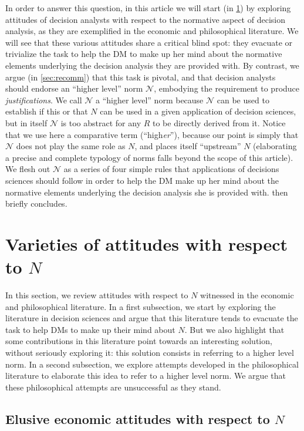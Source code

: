 \documentclass[preprint, french, english, 11pt, authoryear]{elsarticle}%
\newcommand{\protectforpdf}[1]{\texorpdfstring{\ensuremath{#1}}{#1}}
\newcommand{\adv}{\mathscr{N}}
\begin{document}
In order to answer this question, in this article we will start (in \cref{sec:existing}) by exploring attitudes of decision analysts with respect to the normative aspect of decision analysis, as they are exemplified in the economic and philosophical literature. We will see that these various attitudes share a critical blind spot: they evacuate or trivialize the task to help the \ac{DM} to make up her mind about the normative elements underlying the decision analysis they are provided with. By contrast, we argue (in \cref{sec:recomm}) that this task is pivotal, and that decision analysts should endorse an “higher level” norm $\adv$, embodying the requirement to produce \emph{justifications}. We call $\adv$ a “higher level” norm because $\adv$ can be used to establish if this or that $N$ can be used in a given application of decision sciences, but in itself $\adv$ is too abstract for any $R$ to be directly derived from it. Notice that we use here a comparative term (“high\emph{er}”), because our point is simply that $\adv$ does not play the same role as $N$, and places itself “upstream” $N$ (elaborating a precise and complete typology of norms falls beyond the scope of this article). We flesh out $\adv$ as a series of four simple rules that applications of decisions sciences should follow in order to help the \ac{DM} make up her mind about the normative elements underlying the decision analysis she is provided with.  then briefly concludes.

\section{Varieties of attitudes with respect to \protectforpdf{N}}
\label{sec:existing}
In this section, we review attitudes with respect to $N$ witnessed in the economic and philosophical literature. In a first subsection, we start by exploring the literature in decision sciences and argue that this literature tends to evacuate the task to help \acp{DM} to make up their mind about $N$. But we also highlight that some contributions in this literature point towards an interesting solution, without seriously exploring it: this solution consists in referring to a higher level norm. In a second subsection, we explore attempts developed in the philosophical literature to elaborate this idea to refer to a higher level norm. We argue that these philosophical attempts are unsuccessful as they stand.

\subsection{Elusive economic attitudes with respect to \protectforpdf{N}}
\end{document}
